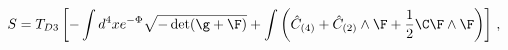 \begin{equation}
\label{action}
S = T_{D3}\left[ -\int d^4x e^{-\Phi}\sqrt{-\det(\g+\F)} 
    + \int\left(\hat{C}_{(4)} + \hat{C}_{(2)}\wedge\F
                + \frac{1}{2}\C\F\wedge\F\right)
\right]\,,
\end{equation}

